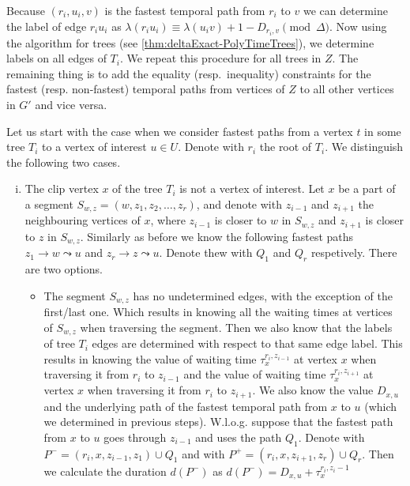 \documentclass[11pt,a4paper]{article}
\theoremstyle{remark}
\theoremstyle{definition}
\begin{document}
Because $(r_i,u_i,v)$ is the fastest temporal path from $r_i$ to $v$ we can determine the label of edge $r_iu_i$ as 
$\lambda (r_i u_i) \equiv \lambda(u_i v) + 1 - D_{r_i,v} \pmod \Delta$.
Now using the algorithm for trees (see \cref{thm:deltaExact-PolyTimeTrees}), we determine labels on all edges of $T_i$.
We repeat this procedure for all trees in $Z$.
The remaining thing is to add the equality (resp.~inequality) constraints for the fastest (resp. non-fastest) temporal paths from vertices of $Z$ to all other vertices in $G'$ and vice versa.

Let us start with the case when we consider fastest paths from a vertex $t$ in some tree $T_i$ to a vertex of interest $u \in U$.
Denote with $r_i$ the root of $T_i$.
We distinguish the following two cases.
\begin{enumerate}[(i)]
    \item The clip vertex $x$ of the tree $T_i$ is not a vertex of interest.
    Let $x$ be a part of a segment $S_{w,z} = (w, z_1, z_2, \dots, z_r )$, and denote with $z_{i-1}$ and $z_{i+1}$ the neighbouring vertices of $x$, 
    where $z_{i-1}$ is closer to $w$ in $S_{w,z}$ and 
    $z_{i+1}$ is closer to $z$ in $S_{w,z}$.
    Similarly as before we know the following fastest paths $z_1 \rightarrow w \leadsto u$ and
    $z_r \rightarrow z \leadsto u$.
    Denote thew with $Q_1$ and $Q_r$ respetively.
    There are two options.
    \begin{itemize}
        \item The segment $S_{w,z}$ has no undetermined edges, with the exception of the first/last one.
        Which results in knowing all the waiting times at vertices of $S_{w,z}$ when traversing the segment.
        Then we also know that the labels of tree $T_i$ edges are determined with respect to that same edge label.
        This results in knowing the value of waiting time
        $\tau_x^{r_i,z_{i-1}}$ at vertex $x$ when traversing it from $r_i$ to $z_{i-1}$ and 
        the value of waiting time $\tau_x^{r_i,z_{i+1}}$ at vertex $x$
        when traversing it from $r_i$ to $z_{i+1}$.
        We also know the value $D_{x,u}$ and the underlying path of the fastest temporal path from $x$ to $u$ (which we determined in previous steps).
        W.l.o.g. suppose that the fastest path from $x$ to $u$ goes through $z_{i-1}$ and uses the path $Q_1$.
        Denote with $P^{-} = (r_i, x, z_{i-1}, z_1) \cup Q_1$
        and with $P^{+} = (r_i, x, z_{i+1}, z_r) \cup Q_r$.
        Then we calculate the duration $d(P^{-})$ as $d(P^{-}) = D_{x,u} + \tau_x^{r_i,z_i-1}$

\end{itemize}
\end{enumerate}
\end{document}

